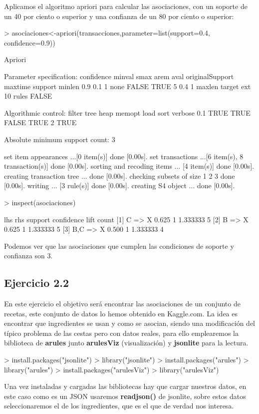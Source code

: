 \documentclass [a4paper] {article}
\begin{document}
Aplicamos el algoritmo apriori para calcular las asociaciones, con un soporte de un 40 por ciento o superior y una confianza de un 80 por ciento o superior:
\begin{Schunk}
\begin{Sinput}
> asociaciones<-apriori(transacciones,parameter=list(support=0.4, confidence=0.9))
\end{Sinput}
\begin{Soutput}
Apriori

Parameter specification:
 confidence minval smax arem  aval originalSupport maxtime support minlen
        0.9    0.1    1 none FALSE            TRUE       5     0.4      1
 maxlen target   ext
     10  rules FALSE

Algorithmic control:
 filter tree heap memopt load sort verbose
    0.1 TRUE TRUE  FALSE TRUE    2    TRUE

Absolute minimum support count: 3 

set item appearances ...[0 item(s)] done [0.00s].
set transactions ...[6 item(s), 8 transaction(s)] done [0.00s].
sorting and recoding items ... [4 item(s)] done [0.00s].
creating transaction tree ... done [0.00s].
checking subsets of size 1 2 3 done [0.00s].
writing ... [3 rule(s)] done [0.00s].
creating S4 object  ... done [0.00s].
\end{Soutput}
\begin{Sinput}
> inspect(asociaciones)
\end{Sinput}
\begin{Soutput}
    lhs      rhs support confidence lift     count
[1] {C}   => {X} 0.625   1          1.333333 5    
[2] {B}   => {X} 0.625   1          1.333333 5    
[3] {B,C} => {X} 0.500   1          1.333333 4    
\end{Soutput}
\end{Schunk}

Podemos ver que las asociaciones que cumplen las condiciones de soporte y confianza son 3.

\subsection{Ejercicio 2.2}
En este ejercicio el objetivo será encontrar las asociaciones de un conjunto de recetas, este conjunto de datos lo hemos obtenido en Kaggle.com. 
La idea es encontrar que ingredientes se usan y como se asocian, siendo una modificación del típico problema de las cestas pero con datos reales,
para ello emplearemos la biblioteca de \textbf{arules} junto \textbf{arulesViz} (visualización) y \textbf{jsonlite}  para la lectura.
\begin{Schunk}
\begin{Sinput}
> install.packages("jsonlite")
> library("jsonlite")
> install.packages("arules")
> library("arules")
> install.packages("arulesViz")
> library("arulesViz")
\end{Sinput}
\end{Schunk}
Una vez instaladas y cargadas las bibliotecas hay que cargar nuestros datos, en este caso como es un JSON usaremos \textbf{readjson()} de jsonlite, sobre estos
datos seleccionaremos el de los ingredientes, que es el que de verdad nos interesa.
\end{document}
